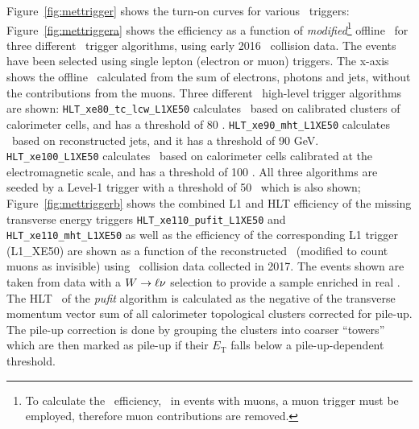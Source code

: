 				Figure~\ref{fig:mettrigger} shows the turn-on curves for various \met\ triggers: Figure~\ref{fig:mettriggera} shows the efficiency as a function of \textit{modified}\footnote{To calculate the \met\ efficiency, \eg\ in events with muons, a muon trigger must be employed, therefore muon contributions are removed.} offline \met\ for three different \met\ trigger algorithms, using early 2016 \pp\ collision data. The events have been selected using single lepton (electron or muon) triggers. The x-axis shows the offline \met\ calculated from the sum of electrons, photons and jets, without the contributions from the muons. Three different \met\ high-level trigger algorithms are shown: \texttt{HLT\_xe80\_tc\_lcw\_L1XE50} calculates \met\ based on calibrated clusters of calorimeter cells, and has a threshold of 80 \GeV. \texttt{HLT\_xe90\_mht\_L1XE50} calculates \met\ based on reconstructed jets, and it has a threshold of 90 GeV. \texttt{HLT\_xe100\_L1XE50} calculates \met\ based on calorimeter cells calibrated at the electromagnetic scale, and has a threshold of 100 \GeV. All three algorithms are seeded by a Level-1 trigger with a threshold of 50 \GeV\ which is also shown; Figure~\ref{fig:mettriggerb} shows the combined \ac{L1} and \ac{HLT} efficiency of the missing transverse energy triggers \texttt{HLT\_xe110\_pufit\_L1XE50} and \\ \texttt{HLT\_xe110\_mht\_L1XE50} as well as the efficiency of the corresponding \ac{L1} trigger (L1\_XE50) are shown as a function of the reconstructed \met\ (modified to count muons as invisible) using \pp\ collision data collected in 2017. The events shown are taken from data with a $W \rightarrow \ell \nu$ selection to provide a sample enriched in real \met. The \ac{HLT} \met\ of the \textit{pufit} algorithm is calculated as the negative of the transverse momentum vector sum of all calorimeter topological clusters corrected for pile-up. The pile-up correction is done by grouping the clusters into coarser “towers” which are then marked as pile-up if their $E_\mathrm{T}$ falls below a pile-up-dependent threshold.

